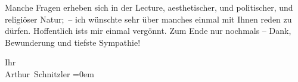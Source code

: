 \pstart
           Manche Fragen erheben sich in der Lecture, aesthetischer, und politischer, und
               religiöser Natur; – ich wünschte sehr über manches einmal mit Ihnen reden zu dürfen.
               Hoffentlich ists mir einmal vergönnt. Zum Ende nur nochmals – Dank, Bewunderung und
               tiefste Sympathie!\pend
           
\pstart
           Ihr{\\[\baselineskip]}\spacefill\mbox{Arthur Schnitzler}\pend
           \leftskip=0em{}\endnumbering{}  
      